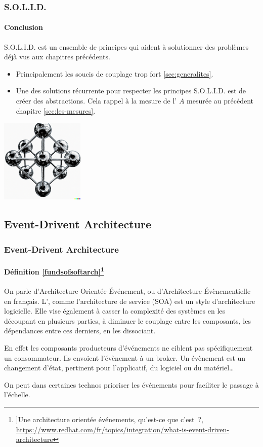 \documentclass{beamer}
\begin{document}
    \begin{frame}
        \transdissolve
        \frametitle{S.O.L.I.D.}
        \framesubtitle{Conclusion}
        S.O.L.I.D. est un ensemble de principes qui aident à solutionner des problèmes déjà vus aux chapitres précédents.
        \begin{itemize}
            \item Principalement les soucis de couplage trop fort \cref{sec:generalites}.
            \item Une des solutions récurrente pour respecter les principes S.O.L.I.D. est de créer des abstractions.
            Cela rappel à la mesure de l' $A$ mesurée au précédent chapitre \cref{sec:les-mesures}.
        \end{itemize}
        \bigbreak
        \centering
        \includegraphics[width=4cm]{image/carbon-atoms}
    \end{frame}

    \subsection{Event-Drivent Architecture}\label{subsec:event-drivent-architecture}

    \begin{frame}
        \transdissolve
        \frametitle{Event-Drivent Architecture}
        \framesubtitle{Définition \cref{fundsofsoftarch}\footnotestep\footnote{\label{redhateda}]Une architecture orientée événements, qu'est-ce que c'est~?, \url{https://www.redhat.com/fr/topics/integration/what-is-event-driven-architecture}}}
        On parle d'Architecture Orientée Événement, ou d'Architecture Évènementielle en français.
        L', comme l'architecture de service (SOA) est un style d'architecture logicielle.
        \bigbreak
        Elle vise également à casser la complexité des systèmes en les découpant en plusieurs parties, à diminuer le couplage entre les composants, les dépendances entre ces derniers, en les dissociant.

        En effet les composants producteurs d'événements ne ciblent pas spécifiquement un consommateur.
        Ils envoient l'évènement à un broker.
        \bigbreak
        Un évènement est un changement d'état, pertinent pour l'applicatif, du logiciel ou du matériel\ldots

        On peut dans certaines technos prioriser les événements pour faciliter le passage à l'échelle.
    \end{frame}
\end{document}
